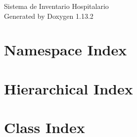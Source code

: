 \documentclass[twoside]{book}
\newcommand{\+}{\discretionary{\mbox{\scriptsize$\hookleftarrow$}}{}{}}
\newcommand{\clearemptydoublepage}{%
    \newpage{\pagestyle{empty}\cleardoublepage}%
  }
\begin{document}
  \raggedbottom
    \hypersetup{pageanchor=false,
                bookmarksnumbered=true,
                pdfencoding=unicode
               }
  \begin{titlepage}
  \vspace*{7cm}
  \begin{center}%
  {\Large Sistema de Inventario Hospitalario}\\
  \vspace*{1cm}
  {\large Generated by Doxygen 1.13.2}\\
  \end{center}
  \end{titlepage}
  \clearemptydoublepage
  \tableofcontents
  \clearemptydoublepage
  \hypersetup{pageanchor=true}




\chapter{Namespace Index}

\chapter{Hierarchical Index}

\chapter{Class Index}

\end{document}
